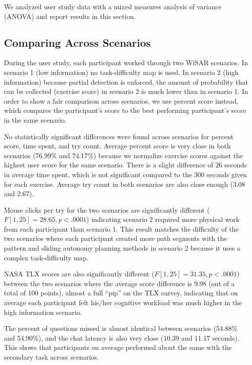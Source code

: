 We analyzed user study data with a mixed measures analysis of variance (ANOVA) and report results in this section.

\subsection{Comparing Across Scenarios}

During the user study, each participant worked through two WiSAR scenarios. In scenario 1 (low information) no task-difficulty map is used. In scenario 2 (high information) because partial detection is enforced, the amount of probability that can be collected (exercise score) in scenario 2 is much lower than in scenario 1. In order to show a fair comparison across scenarios, we use percent score instead, which compares the participant's score to the best performing participant's score in the same scenario.

No statistically significant differences were found across scenarios for percent score, time spent, and try count. Average percent score is very close in both scenarios (76.99\% and 74.17\%) because we normalize exercise scores against the highest user score for the same scenario. There is a slight difference of 26 seconds in average time spent, which is not significant compared to the 300 seconds given for each exercise. Average try count in both scenarios are also close enough (3.08 and 2.67).

Mouse clicks per try for the two scenarios are significantly different ($F[1,25]= 28.65, p<.0001$) indicating scenario 2 required more physical work from each participant than scenario 1. This result matches the difficulty of the two scenarios where each participant created more path segments with the pattern and sliding autonomy planning methods in scenario 2 because it uses a complex task-difficulty map.

NASA TLX scores are also significantly different ($F[1,25]= 31.35, p<.0001$) between the two scenarios where the average score difference is 9.98 (out of a total of 100 points), almost a full ``pip'' on the TLX survey, indicating that on average each participant felt his/her cognitive workload was much higher in the high information scenario.

The percent of questions missed is almost identical between scenarios (54.88\% and 54.90\%), and the chat latency is also very close (10.39 and 11.17 seconds). This shows that participants on average performed about the same with the secondary task across scenarios.


